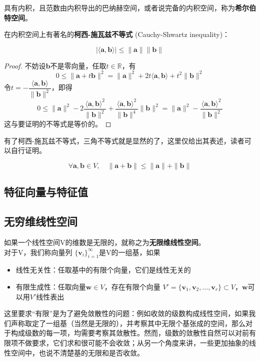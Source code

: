 \begin{definition}[希尔伯特空间]\label{def:hilbert_space}
    具有内积，且范数由内积导出的巴纳赫空间，或者说完备的内积空间，称为\textbf{希尔伯特空间}。
\end{definition}

在内积空间上有著名的\textbf{柯西-施瓦兹不等式} (Cauchy-Shwartz inequality)：
\begin{theorem}[柯西-施瓦兹不等式]
    \[|\langle \mathbf{a,b}\rangle| \leq \| \mathbf{a}\| \| \mathbf{b}\| \]
\end{theorem}
\begin{proof}
不妨设$\mathbf{b}$不是零向量，任取$t\in \mathbb{R}$，有
\[0\leq \|\mathbf{a}+t\mathbf{b}\|^2=\|\mathbf{a}\|^2+2t\langle\mathbf{a,b}\rangle +t^2\|\mathbf{b}\|^2\]
令$t=-\dfrac{\langle\mathbf{a,b}\rangle}{\|\mathbf{b}\|^2}$，即得
\[0\leq \|\mathbf{a}\|^2-2\frac{\langle\mathbf{a,b}\rangle^2}{\|\mathbf{b}\|^2} +\frac{\langle\mathbf{a,b}\rangle^2}{\|\mathbf{b}\|^4}\|\mathbf{b}\|^2=\|\mathbf{a}\|^2-\frac{\langle\mathbf{a,b}\rangle^2}{\|\mathbf{b}\|^2}\]
这与要证明的不等式是等价的。
\end{proof} 
有了柯西-施瓦兹不等式，三角不等式就是显然的了，这里仅给出其表述，读者可以自行证明。
\begin{proposition}[三角不等式]
    \[\forall \mathbf{a,b}\in V,\quad\|\mathbf{a+b}\|\leq\|\mathbf{a}\|+\|\mathbf{b}\|\]
\end{proposition}

\subsection{特征向量与特征值}\label{sub:eigenvector}



\subsection{无穷维线性空间}\label{sub:infinite_linear}

\begin{definition}[无限维线性空间和基]
    如果一个线性空间V的维数是无限的，就称之为\textbf{无限维线性空间}。\\
对于V，我们称向量列
$\lbrace\mathbf{v}_i\rbrace_{i=1}^{\infty}$是V的一组基，如果
\begin{itemize}
    \item 线性无关性：任取基中的有限个向量，它们是线性无关的
    \item 有限生成性：任取向量$\mathbf{w} \in V$，存在有限个向量
          $V'=\lbrace\mathbf{v}_1,\mathbf{v}_2,\dots,\mathbf{v}_r\rbrace\subset V $，$\mathbf{w}$可以用$V'$线性表出
\end{itemize}
\end{definition}
这里要求“有限”是为了避免敛散性的问题：例如收敛的级数构成线性空间，如果我们声称取定了一组基（当然是无限的），并考察其中无限个基张成的空间，那么对于构成级数的每一项，均需要考察其敛散性。然而，级数的敛散性自然可以对前有限项不做要求，它们求和很可能不会收敛；从另一个角度来讲，一些更加抽象的线性空间中，也说不清楚基的无限和是否收敛。

